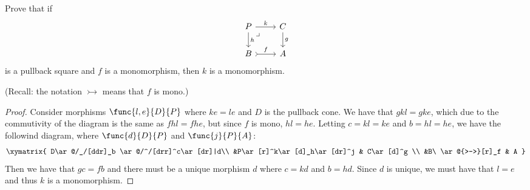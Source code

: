 \documentclass[main.tex]{subfiles}
\begin{document}
\paragraph{}
\begin{exercise}
	Prove that if
	\[\begin{tikzcd}
			P \ar[r, "k"] \ar[d, "h"]
			\ar[dr, phantom, "\lrcorner", very near start] & C\ar[d, "g"] \\
			B \ar[r, rightarrowtail, "f"] & A
	\end{tikzcd}\]
	is a pullback square and $f$ is a monomorphism, then $k$ is a monomorphism.
\end{exercise}
(Recall: the notation $\rightarrowtail$ means that $f$ is mono.)
\begin{proof}
	Consider morphisms $\func{l,e}{D}{P}$ where $ke=le$ and $D$ is the pullback cone. We have that $gkl = gke$, which due to the commutivity of the diagram is the same as $fhl = fhe$, but since $f$ is mono, $hl=he$. Letting $c=kl=ke$ and $b=hl=he$, we have the followind diagram, where $\func{d}{D}{P}$ and $\func{j}{P}{A}$:
	$$
	\xymatrix{
		D\ar@/_/[ddr]_b \ar@/^/[drr]^c\ar[dr]|d\\
		&P\ar[r]^k\ar[d]_h\ar[dr]^j & C\ar[d]^g \\
		&B\ \ar@{>->}[r]_f & A
	}
	$$
	Then we have that $gc=fb$ and there must be a unique morphism $d$ where $c=kd$ and $b=hd$. Since $d$ is unique, we must have that $l=e$ and thus $k$ is a monomorphism.
\end{proof}
\end{document}
